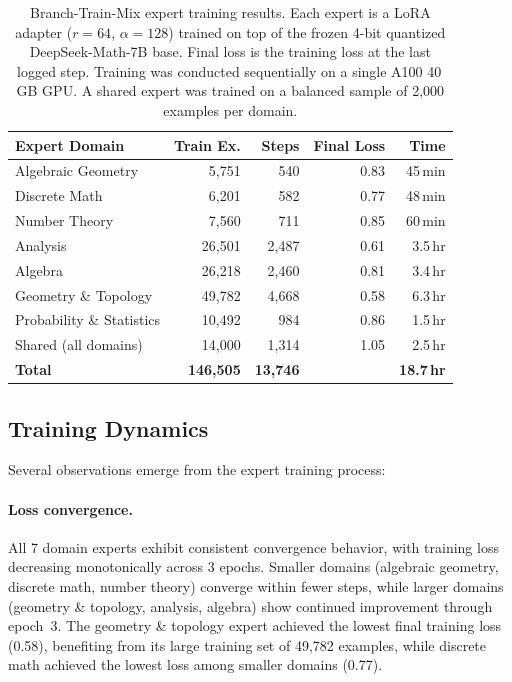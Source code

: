 \documentclass[11pt,a4paper]{article}
\begin{document}
\begin{table}[t]
\centering
\caption{Branch-Train-Mix expert training results. Each expert is a LoRA adapter ($r{=}64$, $\alpha{=}128$) trained on top of the frozen 4-bit quantized DeepSeek-Math-7B base. Final loss is the training loss at the last logged step. Training was conducted sequentially on a single A100 40\,GB GPU. A shared expert was trained on a balanced sample of 2,000 examples per domain.}
\label{tab:expert_training}
\small
\begin{tabular}{@{}lrrrr@{}}
\toprule
\textbf{Expert Domain} & \textbf{Train Ex.} & \textbf{Steps} & \textbf{Final Loss} & \textbf{Time} \\
\midrule
Algebraic Geometry & 5,751 & 540 & 0.83 & 45\,min \\
Discrete Math & 6,201 & 582 & 0.77 & 48\,min \\
Number Theory & 7,560 & 711 & 0.85 & 60\,min \\
Analysis & 26,501 & 2,487 & 0.61 & 3.5\,hr \\
Algebra & 26,218 & 2,460 & 0.81 & 3.4\,hr \\
Geometry \& Topology & 49,782 & 4,668 & 0.58 & 6.3\,hr \\
Probability \& Statistics & 10,492 & 984 & 0.86 & 1.5\,hr \\
\midrule
Shared (all domains) & 14,000 & 1,314 & 1.05 & 2.5\,hr \\
\midrule
\textbf{Total} & \textbf{146,505} & \textbf{13,746} & & \textbf{18.7\,hr} \\
\bottomrule
\end{tabular}
\end{table}

\subsection{Training Dynamics}

Several observations emerge from the expert training process:

\paragraph{Loss convergence.}
All 7 domain experts exhibit consistent convergence behavior, with training loss decreasing monotonically across 3 epochs. Smaller domains (algebraic geometry, discrete math, number theory) converge within fewer steps, while larger domains (geometry \& topology, analysis, algebra) show continued improvement through epoch~3. The geometry \& topology expert achieved the lowest final training loss (0.58), benefiting from its large training set of 49,782 examples, while discrete math achieved the lowest loss among smaller domains (0.77).
\end{document}
